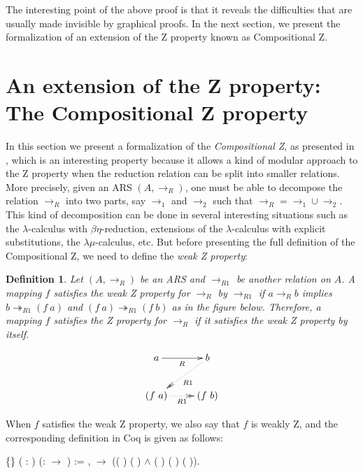 \documentclass[a4paper]{article}
\newcommand{\tto}{\twoheadrightarrow}
\newtheorem{definition}{Definition}[section]
\begin{document}
The interesting point of the above proof is that it reveals the
difficulties that are usually made invisible by graphical proofs. In
the next section, we present the formalization of an extension of the
Z property known as Compositional Z.

\section{An extension of the Z property: The Compositional Z property}

In this section we present a formalization of the
\textit{Compositional Z}, as presented in \cite{nakazawaCompositionalConfluenceProofs2016},
which is an interesting property because it allows a kind of modular
approach to the Z property when the reduction relation can be split
into smaller relations. More precisely, given an ARS $(A,\to_R)$, one
must be able to decompose the relation $\to_R$ into two parts, say
$\to_1$ and $\to_2$ such that $\to_R = \to_1\cup \to_2$. This kind of
decomposition can be done in several interesting situations such as
the $\lambda$-calculus with $\beta\eta$-reduction\cite{barendregtLambdaCalculusIts1984},
extensions of the $\lambda$-calculus with explicit
substitutions\cite{abadiExplicitSubstitutions1991}, the $\lambda\mu$-calculus\cite{parigotLambdaMuCalculusAlgorithmicInterpretation1992},
etc. But before presenting the full definition of the Compositional Z,
we need to define the \textit{weak Z property}:

\begin{definition} Let $(A,\to_R)$ be an ARS and $\to_{R1}$ be another
  relation on $A$. A mapping $f$ satisfies the {\it weak Z property}
  for $\to_R$ by $\to_{R1}$ if $a\to_R b$ implies $b \tto_{R1} (f\ a)$ and
  $(f\ a) \tto_{R1} (f\ b)$ as in the figure below. Therefore, a
  mapping $f$ satisfies the Z property for $\to_R$ if it satisfies the
  weak Z property by itself.
  
  \begin{figure}[h] \centering \[ \xymatrix{ a \ar[r]_R & b
      \ar@{.>>}[dl]^{R1}\\ (f\ a) \ar@{.>>}[r]_{R1} & (f\ b) \\ } \]
\end{figure}
\end{definition}

When $f$ satisfies the weak Z property, we also say that $f$ is weakly
Z, and the corresponding definition in Coq is given as
follows: \begin{coqdoccode} \coqdocemptyline \coqdocnoindent
    \{\}
  ( :  )
  (:  \ensuremath{\rightarrow}
  ) := \coqdockw{\ensuremath{\forall}} 
  ,   
  \ensuremath{\rightarrow} (( )
   ( ) \ensuremath{\land}
  ( ) ( )
  ( )).\coqdoceol \coqdocemptyline
\end{coqdoccode}
\end{document}
